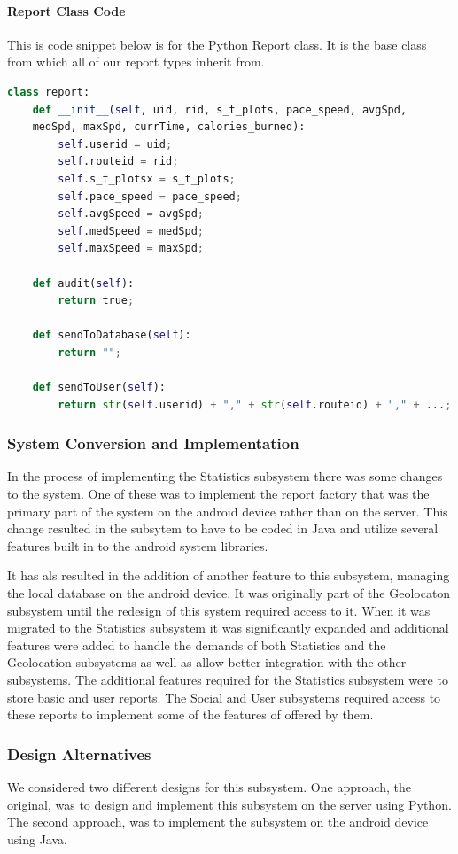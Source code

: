 ﻿\documentclass{article}
\begin{document}
\paragraph{Report Class Code}
This is code snippet below is for the Python Report class. It is the base class from which all of our report types inherit from.
\begin{lstlisting}[language=Python]
class report:
    def __init__(self, uid, rid, s_t_plots, pace_speed, avgSpd,
    medSpd, maxSpd, currTime, calories_burned):
        self.userid = uid;
        self.routeid = rid;
        self.s_t_plotsx = s_t_plots;
        self.pace_speed = pace_speed;
        self.avgSpeed = avgSpd;
        self.medSpeed = medSpd;
        self.maxSpeed = maxSpd;

    def audit(self):
        return true;

    def sendToDatabase(self):
        return "";

    def sendToUser(self):
        return str(self.userid) + "," + str(self.routeid) + "," + ...;
\end{lstlisting}

\subsubsection{System Conversion and Implementation}
In the process of implementing the Statistics subsystem there was some changes to the system. One of these was to implement the report factory that was the primary part of the system on the android device rather than on the server. This change resulted in the subsytem to have to be coded in Java and utilize several features built in to the android system libraries.

It has als resulted in the addition of another feature to this subsystem, managing the local database on the android device. It was originally part of the Geolocaton subsystem until the redesign of this system required access to it. When it was migrated to the Statistics subsystem it was significantly expanded and additional features were added to handle the demands of both Statistics and the Geolocation subsystems as well as allow better integration with the other subsystems. The additional features required for the Statistics subsystem were to store basic and user reports. The Social and User subsystems required access to these reports to implement some of the features of offered by them.

\subsubsection{Design Alternatives}
We considered two different designs for this subsystem. One approach, the original, was to design and implement this subsystem on the server using Python. The second approach, was to implement the subsystem on the android device using Java. 
\end{document}

